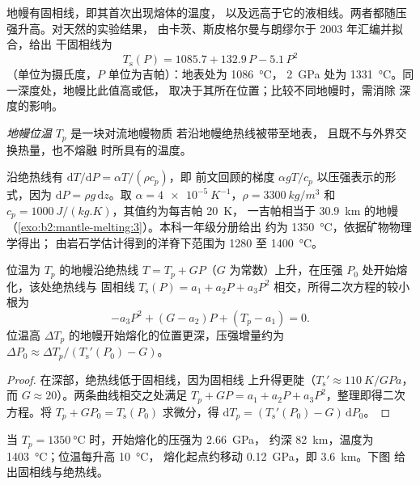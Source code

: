 地幔有固相线，即其首次出现熔体的温度，
以及远高于它的液相线。两者都随压强升高。对天然的实验结果，
由卡茨、斯皮格尔曼与朗缪尔于 2003 年汇编并拟合，给出
干固相线为
\[
  T_{\mathrm{s}}(P) = 1085.7 + 132.9\,P - 5.1\,P^2
\]
（单位为摄氏度，$P$ 单位为吉帕）：地表处为 \qty{1086}{\celsius}，
\qty{2}{GPa} 处为 \qty{1331}{\celsius}。同一深度处，地幔比此值高或低，
取决于其所在位置；比较不同地幔时，需消除
深度的影响。

\begin{definition}[地幔位温]\label{def:b2:mantle-melting:tp}
\emph{地幔位温} $T_p$ 是一块对流地幔物质
若沿地幔绝热线被带至地表，
且既不与外界交换热量，也不熔融
时所具有的温度。
\end{definition}

沿绝热线有 $\mathrm dT/\mathrm dP = \alpha T/(\rho c_p)$，即
前文回顾的梯度 $\alpha gT/c_p$ 以压强表示的形式，因为 $\mathrm dP = \rho
g\,\mathrm dz$。取 $\alpha = \qty{4e-5}{K^{-1}}$，$\rho = \qty{3300}{kg/m^3}$
和 $c_p = \qty{1000}{J/(kg.K)}$，其值约为每吉帕 \qty{20}{K}，
一吉帕相当于 \qty{30.9}{km} 的地幔（\cref{exo:b2:mantle-melting:3}）。本科一年级分册给出
约为 \qty{1350}{\celsius}，依据矿物物理学得出；
由岩石学估计得到的洋脊下范围为 1280 至
\qty{1400}{\celsius}。

\begin{proposition}[减压熔融的开始]\label{prop:b2:mantle-melting:onset}
位温为 $T_p$ 的地幔沿绝热线 $T = T_p + GP$（$G$
为常数）上升，在压强 $P_0$ 处开始熔化，该处绝热线与
固相线 $T_{\mathrm s}(P) = a_1 + a_2P + a_3P^2$ 相交，所得二次方程的较小根为
\[
  -a_3P^2 + (G - a_2)P + (T_p - a_1) = 0 .
\]
位温高 $\Delta T_p$ 的地幔开始熔化的位置更深，压强增量约为 $\Delta P_0 \approx
\Delta T_p/(T_{\mathrm s}'(P_0) - G)$。
\end{proposition}

\begin{proof}
在深部，绝热线低于固相线，因为固相线
上升得更陡（$T_{\mathrm
s}' \approx \qty{110}{K/GPa}$，而 $G \approx 20$）。两条曲线相交之处满足
$T_p + GP = a_1 + a_2P + a_3P^2$，整理即得二次方程。将
$T_p + GP_0 = T_{\mathrm s}(P_0)$ 求微分，得 $\mathrm dT_p = (T_{\mathrm s}'(P_0) -
G)\,\mathrm dP_0$。
\end{proof}

当 $T_p = \qty{1350}{\celsius}$ 时，开始熔化的压强为 \qty{2.66}{GPa}，
约深 \qty{82}{km}，温度为 \qty{1403}{\celsius}；位温每升高 \qty{10}{\celsius}，
熔化起点约移动 \qty{0.12}{GPa}，即 \qty{3.6}{km}。下图
给出固相线与绝热线。

